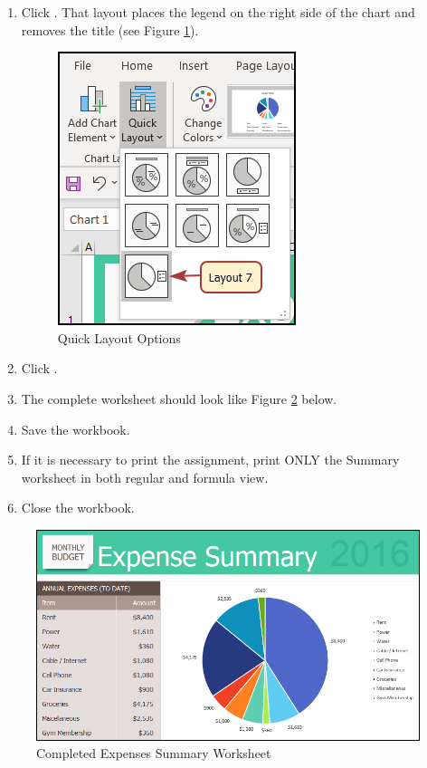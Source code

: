 \begin{enumerate}[resume]
	\item Click . That layout places the legend on the right side of the chart and removes the title (see Figure \ref{06:fig07a}).

	\begin{figure}[H]
		\centering
		\includegraphics[width=\maxwidth{.60\linewidth}]{gfx/ch06_fig07a}
		\caption{Quick Layout Options}
		\label{06:fig07a}
	\end{figure}

	\item Click .
	\item The complete  worksheet should look like Figure \ref{06:fig08} below.
	\item Save the  workbook. 
	\item If it is necessary to print the assignment, print ONLY the Summary worksheet in both regular and formula view. 
	\item Close the  workbook.
\end{enumerate}

\begin{figure}[H]
	\centering
	\includegraphics[width=\maxwidth{.95\linewidth}]{gfx/ch06_fig08}
	\caption{Completed Expenses Summary Worksheet}
	\label{06:fig08}
\end{figure}


